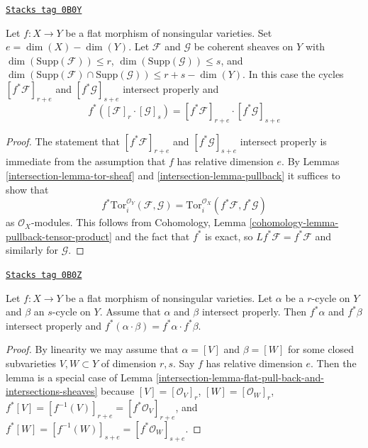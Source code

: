 \begin{lemma}
\label{intersection-lemma-flat-pull-back-and-intersections-sheaves}
\href{https://stacks.math.columbia.edu/tag/0B0Y}{\texttt{Stacks tag 0B0Y}}

Let $f : X \to Y$ be a flat morphism of nonsingular varieties. Set
$e = \dim(X) - \dim(Y)$. Let $\mathcal{F}$ and $\mathcal{G}$ be coherent
sheaves on $Y$ with $\dim(\text{Supp}(\mathcal{F})) \leq r$,
$\dim(\text{Supp}(\mathcal{G})) \leq s$, and
$\dim(\text{Supp}(\mathcal{F}) \cap \text{Supp}(\mathcal{G}) )
\leq r + s - \dim(Y)$. In this case the cycles
$[f^*\mathcal{F}]_{r + e}$ and $[f^*\mathcal{G}]_{s + e}$
intersect properly and
$$
f^*([\mathcal{F}]_r \cdot [\mathcal{G}]_s) =
[f^*\mathcal{F}]_{r + e} \cdot [f^*\mathcal{G}]_{s + e}
$$
\end{lemma}

\begin{proof}

The statement that $[f^*\mathcal{F}]_{r + e}$ and $[f^*\mathcal{G}]_{s + e}$
intersect properly is immediate from the assumption that $f$ has
relative dimension $e$. By
Lemmas \ref{intersection-lemma-tor-sheaf} and \ref{intersection-lemma-pullback}
it suffices to show that
$$
f^*\text{Tor}_i^{\mathcal{O}_Y}(\mathcal{F}, \mathcal{G}) =
\text{Tor}_i^{\mathcal{O}_X}(f^*\mathcal{F}, f^*\mathcal{G})
$$
as $\mathcal{O}_X$-modules. This follows from
Cohomology, Lemma \ref{cohomology-lemma-pullback-tensor-product}
and the fact that $f^*$ is exact, so $Lf^*\mathcal{F} = f^*\mathcal{F}$
and similarly for $\mathcal{G}$.
\end{proof}

\begin{lemma}
\label{intersection-lemma-flat-pullback-and-intersections}
\href{https://stacks.math.columbia.edu/tag/0B0Z}{\texttt{Stacks tag 0B0Z}}

Let $f : X \to Y$ be a flat morphism of nonsingular varieties.
Let $\alpha$ be a $r$-cycle on $Y$ and $\beta$ an $s$-cycle on $Y$.
Assume that $\alpha$ and $\beta$ intersect properly. Then $f^*\alpha$
and $f^*\beta$ intersect properly and
$f^*( \alpha \cdot \beta ) = f^*\alpha \cdot f^*\beta$.
\end{lemma}

\begin{proof}

By linearity we may assume that $\alpha = [V]$ and $\beta = [W]$
for some closed subvarieties $V, W \subset Y$ of dimension $r, s$.
Say $f$ has relative dimension $e$. Then the lemma is a special case of
Lemma \ref{intersection-lemma-flat-pull-back-and-intersections-sheaves}
because $[V] = [\mathcal{O}_V]_r$, $[W] = [\mathcal{O}_W]_r$,
$f^*[V] = [f^{-1}(V)]_{r + e} = [f^*\mathcal{O}_V]_{r + e}$, and
$f^*[W] = [f^{-1}(W)]_{s + e} = [f^*\mathcal{O}_W]_{s + e}$.
\end{proof}

